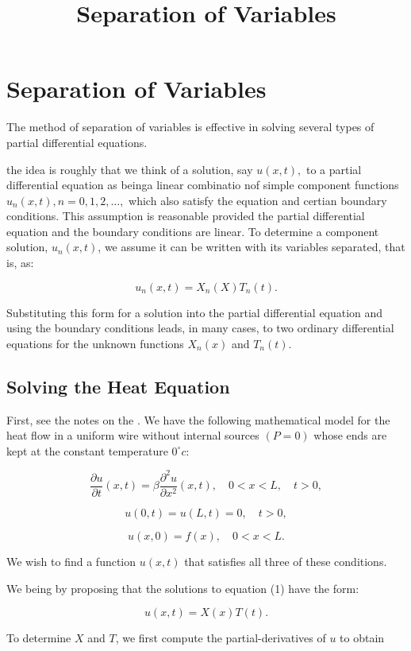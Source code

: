 \documentclass{article}
\title{Separation of Variables}
\begin{document}
\section{Separation of Variables}

The method of separation of variables is effective in solving several types of partial differential equations.

the idea is roughly that we think of a solution, say $u(x,t),$ to a partial differential equation as beinga linear combinatio nof simple component functions $u_n(x,t), n = 0, 1, 2, \dots,$ which also satisfy the equation and certian boundary conditions. This assumption is reasonable provided the partial differential equation and the boundary conditions are linear. To determine a component solution, $u_n(x,t)$, we assume it can be written with its variables separated, that is, as:

\[ u_n(x,t) = X_n(X)T_n(t). \]

Substituting this form for a solution into the partial differential equation and using the boundary conditions leads, in many cases, to two ordinary differential equations for the unknown functions $X_n(x)$ and $T_n(t)$. 

\subsection{Solving the Heat Equation}

First, see the notes on the . We have the following mathematical model for the heat flow in a uniform wire without internal sources $(P = 0)$ whose ends are kept at the constant temperature $0^\circ c$:

\[ \frac{\partial u}{\partial t}(x,t) = \beta \frac{\partial^2 u}{\partial x^2}(x,t), \quad 0 < x < L, \quad t > 0, \tag{1} \]

\[ u(0, t) = u(L, t) = 0, \quad t>0, \tag{2} \]

\[ u(x,0) = f(x), \quad 0 < x < L. \tag{3} \]

We wish to find a function $u(x,t)$ that satisfies all three of these conditions.

We being by proposing that the solutions to equation (1) have the form:

\[ u(x,t) = X(x)T(t). \]

To determine $X$ and $T$, we first compute the \@{partial-derivatives} of $u$ to obtain
\end{document}

